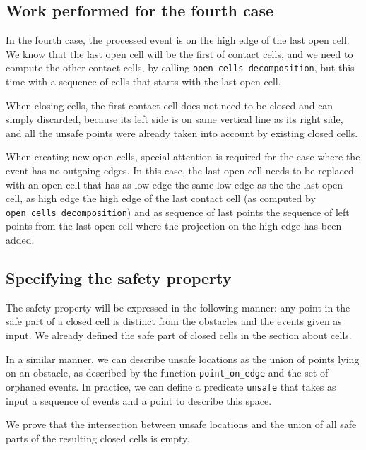 \documentclass[a4paper, USenglish, cleveref, autoref, thm-restate]{lipics-v2021}
\begin{document}
\subsection{Work performed for the fourth case}
In the fourth case, the processed event is on the high edge of the
last open cell.  We know that the last open cell will be the first of
contact cells, and we need to compute the other contact cells, by
calling {\tt open\_cells\_decomposition}, but this time with a sequence
of cells that starts with the last open cell.

When closing cells, the first contact cell does not need to be closed
and can simply discarded, because its left side is on same vertical line as
its right side, and all the unsafe points were already
taken into account by existing closed cells.

When creating new open cells, special attention is required for the
case where the event has no outgoing edges.  In this case, the last
open cell needs to be replaced with an open cell that has as low edge
the same low edge as the the last open cell, as high edge the high
edge of the last contact cell
(as computed by {\tt open\_cells\_decomposition}) and as sequence of
last points the sequence of left points from the last open cell where
the projection on the high edge has been added.

\subsection{Specifying the safety property}
The safety property will
be expressed in the following manner: any point in the safe part of a
closed cell is distinct from the obstacles and the events given as
input.  We already defined the safe part of closed cells in the
section about cells.

In a similar manner, we can describe unsafe locations as the union
of points lying on an obstacle, as described by the function
{\tt point\_on\_edge} and the set of orphaned events.  In practice,
we can define a predicate {\tt unsafe} that takes as input a sequence
of events and a point to describe this space.

We prove that the intersection between unsafe locations and the union
of all safe parts of the resulting closed cells is empty.
\end{document}
